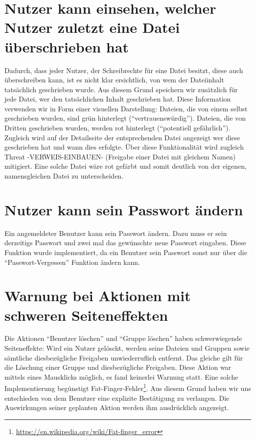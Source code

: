 \documentclass[12pt,DIV14,BCOR10mm,a4paper,parskip=half-,headsepline,headinclude,english,ngerman,bibliography=totocnumbered]{scrreprt}
\begin{document}
\section{Nutzer kann einsehen, welcher Nutzer zuletzt eine Datei überschrieben hat}
Dadurch, dass jeder Nutzer, der Schreibrechte für eine Datei besitzt, diese auch überschreiben kann, ist es nicht klar ersichtlich, von wem der Dateiinhalt tatsächlich geschrieben wurde. Aus diesem Grund speichern wir zusätzlich für jede Datei, wer den tatsächlichen Inhalt geschrieben hat. Diese Information verwenden wir in Form einer visuellen Darstellung: Dateien, die von einem selbst geschrieben wurden, sind grün hinterlegt (\enquote{vertrauenswürdig}). Dateien, die von Dritten geschrieben wurden, werden rot hinterlegt (\enquote{potentiell gefährlich}). Zugleich wird auf der Detailseite der entsprechenden Datei angezeigt wer diese geschrieben hat und wann dies erfolgte.
Über diese Funktionalität wird zugleich Threat -VERWEIS-EINBAUEN- (Freigabe einer Datei mit gleichem Namen) mitigiert. Eine solche Datei wäre rot gefärbt und somit deutlich von der eigenen, namensgleichen Datei zu unterscheiden.

\section{Nutzer kann sein Passwort ändern}
Ein angemeldeter Benutzer kann sein Passwort ändern. Dazu muss er sein derzeitigs Passwort und zwei mal das gewünschte neue Passwort eingaben. Diese Funktion wurde implementiert, da ein Benutzer sein Passwort sonst nur über die \enquote{Passwort-Vergessen} Funktion ändern kann.

\section{Warnung bei Aktionen mit schweren Seiteneffekten}
\label{warning:severe:sideeffects}
Die Aktionen \enquote{Benutzer löschen} und \enquote{Gruppe löschen} haben schwerwiegende Seiteneffekte: Wird ein Nutzer gelöscht, werden seine Dateien und Gruppen sowie sämtliche diesbezügliche Freigaben unwiederruflich entfernt. Das gleiche gilt für die Löschung einer Gruppe und diesbezügliche Freigaben. Diese Aktion war mittels eines Mausklicks möglich, es fand keinerlei Warnung statt. Eine solche Implementierung begünstigt Fat-Finger-Fehler\footnote{\url{https://en.wikipedia.org/wiki/Fat-finger_error}}. Aus diesem Grund haben wir uns entschieden von dem Benutzer eine explizite Bestätigung zu verlangen. Die Auswirkungen seiner geplanten Aktion werden ihm ausdrücklich angezeigt.
\end{document}
